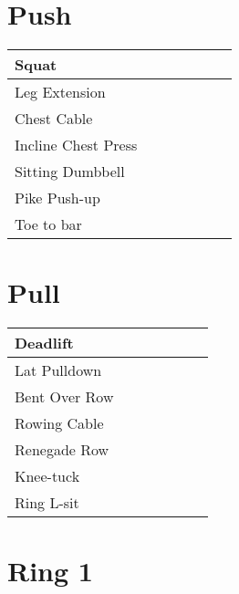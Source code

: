 \documentclass{article}
\begin{document}
\begin{landscape}

\renewcommand{\arraystretch}{2.5}


\section*{Push}

\huge
\noindent\begin{tabularx}{\columnwidth}{ |l|*{6}{R|} }
  \hline
  Squat                            &&&&&&    \\
  \hline
  Leg Extension                    &&&&&&    \\
  \hline
  Chest Cable                      &&&&&&    \\
  \hline
  Incline Chest Press              &&&&&&    \\
  \hline
  Sitting Dumbbell                 &&&&&&    \\
  \hline
  Pike Push-up                     &&&&&&    \\
  \hline
  Toe to bar                       &&&&&&    \\
  \hline
\end{tabularx}



\section*{Pull}

\noindent\begin{tabularx}{\columnwidth}{ |l|*{6}{R|} }
  \hline
  Deadlift                         &&&&&&    \\
  \hline
  Lat Pulldown                     &&&&&&    \\
  \hline
  Bent Over Row                    &&&&&&    \\
  \hline
  Rowing Cable                     &&&&&&    \\
  \hline
  Renegade Row                     &&&&&&    \\
  \hline
  Knee-tuck                        &&&&&&    \\
  \hline
  Ring L-sit                       &&&&&&    \\
  \hline
\end{tabularx}



\section*{Ring 1}


\end{landscape}
\end{document}
